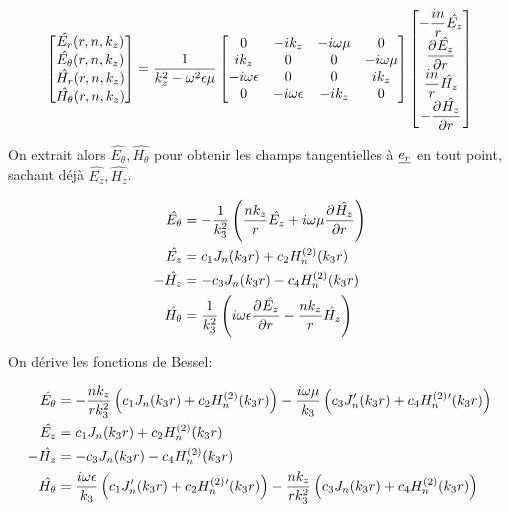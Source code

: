     \begin{equation}
        \begin{bmatrix}
            \hat{E_r}(r,n,k_z)\\
            \hat{E_\theta}(r,n,k_z)\\
            \hat{H_r}(r,n,k_z)\\
            \hat{H_\theta}(r,n,k_z)
        \end{bmatrix} =
        \frac{1}{k_z^2 - \w^2\eps\mu}
        \begin{bmatrix}
        0 & -ik_z & -i\w\mu & 0 
        \\
        ik_z & 0 & 0 & -i\w\mu
        \\
        -i\w\eps & 0 & 0 & ik_z
        \\
        0 & -i\w\eps & -ik_z & 0
        \end{bmatrix}
        \begin{bmatrix}
            -\frac{in}{r}\hat{E_z}\\
            \ddr{r}{\hat{E_z}}\\
            \frac{in}{r}\hat{H_z}\\
            -\ddr{r}{\hat{H_z}}
        \end{bmatrix}
    \end{equation}

    On extrait alors $\hat{E_\theta}, \hat{H_\theta}$ pour obtenir les champs tangentielles à $\v{e_r}$ en tout point, sachant déjà $\hat{E_z}, \hat{H_z}$.

    \begin{align}
        \hat{E_\theta} &= -\frac{1}{k_3^2}\left(\frac{nk_z}{r}\hat{E_z} + i\w\mu\ddr{r}{\hat{H_z}}\right)
        \\
        \hat{E_z} &= c_1 J_n(k_3 r) + c_2 H_n^{(2)}(k_3 r)
        \\
        -\hat{H_z} &= -c_3 J_n(k_3 r) - c_4 H_n^{(2)}(k_3 r)
        \\
        \hat{H_\theta} &= \frac{1}{k_3^2}\left(i\w\eps\ddr{r}{\hat{E_z}} - \frac{nk_z}{r}\hat{H_z}\right)
    \end{align}

    On dérive les fonctions de Bessel:

   \begin{align}
        \hat{E_\theta} &= -\frac{nk_z}{rk_3^2}\left(c_1J_n(k_3r) + c_2 H_n^{(2)}(k_3r)\right) - \frac{i\w\mu}{k_3}\left(c_3J_n'(k_3r) + c_4 H_n^{(2)}{}'(k_3r)\right)
        \\
        \hat{E_z} &= c_1 J_n(k_3 r) + c_2 H_n^{(2)}(k_3 r)
        \\
        -\hat{H_z} &= -c_3 J_n(k_3 r) - c_4 H_n^{(2)}(k_3 r)
        \\
        \hat{H_\theta} &= \frac{i\w\eps}{k_3}\left(c_1J_n'(k_3r) + c_2 H_n^{(2)}{}'(k_3r)\right) - \frac{nk_z}{rk_3^2}\left(c_3J_n(k_3r) + c_4 H_n^{(2)}(k_3r)\right)
    \end{align}

